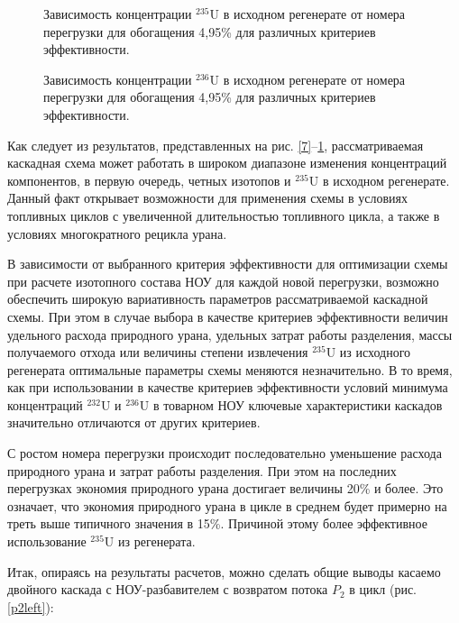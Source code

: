 \begin{figure}[ht]
    \centering
    \begin{minipage}{.5\textwidth}
      \centering
      
      \caption{{Зависимость концентрации $^{235}$U в исходном регенерате от номера перегрузки для обогащения 4,95\% для различных критериев эффективности.{\label{10}}}}
    \end{minipage}%
    \begin{minipage}{.5\textwidth}
      \centering
      
\caption{{Зависимость концентрации $^{236}$U в исходном регенерате от номера перегрузки для обогащения 4,95\% для различных критериев эффективности.{\label{11}}}}
\end{minipage}
\end{figure}




Как следует из результатов, представленных на рис. \ref{7}–\ref{11}, рассматриваемая каскадная схема может работать в широком диапазоне изменения концентраций компонентов, в первую очередь, четных изотопов и $^{235}$U в исходном регенерате. Данный факт открывает возможности для применения схемы в условиях топливных циклов с увеличенной длительностью топливного цикла, а также в условиях многократного рецикла урана.

В зависимости от выбранного критерия эффективности для оптимизации схемы при расчете изотопного состава НОУ для каждой новой перегрузки, возможно обеспечить широкую вариативность параметров рассматриваемой каскадной схемы. При этом в случае выбора в качестве критериев эффективности величин удельного расхода природного урана, удельных затрат работы разделения, массы получаемого отхода или величины степени извлечения $^{235}$U из исходного регенерата оптимальные параметры схемы меняются незначительно. В то время, как при использовании в качестве критериев эффективности условий минимума концентраций $^{232}$U и $^{236}$U в товарном НОУ ключевые характеристики каскадов значительно отличаются от других критериев.

С ростом номера перегрузки происходит последовательно уменьшение расхода природного урана и затрат работы разделения. При этом на последних перегрузках экономия природного урана достигает величины 20\% и более. Это означает, что экономия природного урана в цикле в среднем будет примерно на треть выше типичного значения в 15\%. Причиной этому более эффективное использование $^{235}$U из регенерата.


Итак, опираясь на результаты расчетов, можно сделать общие выводы касаемо двойного каскада с НОУ-разбавителем с возвратом потока $P_2$ в цикл (рис. \ref{p2left}):

